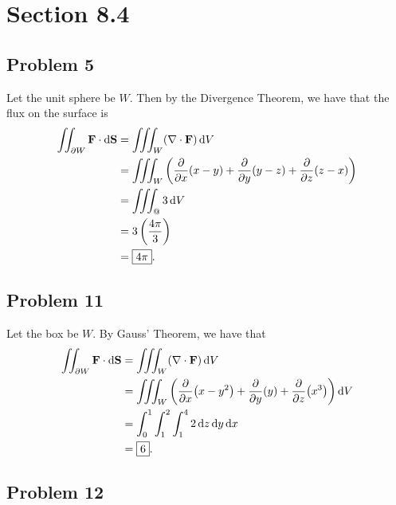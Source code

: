 \documentclass[11pt]{article}
\renewcommand{\vec}[1]{\mathbf{#1}}
\renewcommand{\div}{\nabla \cdot}
\begin{document}

\section{Section 8.4}


\subsection*{Problem 5}

Let the unit sphere be $W$. Then by the Divergence Theorem, we have that the flux on the surface is
\begin{align*}
	\iint_{\partial W} \mathbf{F} \cdot \dd{\vec{S}} &= \iiint_{W} (\div \mathbf{F}) \dd{V} \\
	&= \iiint_{W} \left( \pdv{x} (x - y) + \pdv{y} (y - z) + \pdv{z} (z - x) \right) \\
	&= \iiint_{@} 3 \dd{V} \\
	&= 3 \left( \frac{4\pi}{3} \right) \\
	&= \boxed{4\pi}.
\end{align*}


\subsection*{Problem 11}

Let the box be $W$. By Gauss' Theorem, we have that
\begin{align*}
	\iint_{\partial W} \mathbf{F} \cdot \dd{\vec{S}} &= \iiint_{W} (\div \mathbf{F}) \dd{V} \\
	&= \iiint_{W} \left( \pdv{x} (x - y^{2}) + \pdv{y} (y) + \pdv{z} (x^{3}) \right) \dd{V} \\
	&= \int_{0}^{1} \int_{1}^{2} \int_{1}^{4} 2 \dd{z} \dd{y} \dd{x} \\
	&= \boxed{6}.
\end{align*}


\subsection*{Problem 12}
\end{document}
